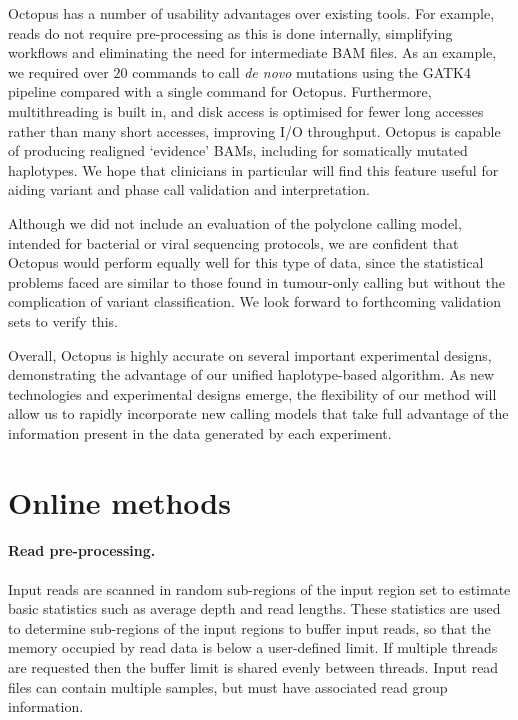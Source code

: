 \documentclass[notitlepage, twocolumn, 10pt]{article}
\begin{document}
Octopus has a number of usability advantages over existing tools.  For example, reads do not require pre-processing as this is done internally, simplifying workflows and eliminating the need for intermediate BAM files. As an example, we required over $20$ commands to call \textit{de novo} mutations using the GATK4 pipeline compared with a single command for Octopus. Furthermore, multithreading is built in, and disk access is optimised for fewer long accesses rather than many short accesses, improving I/O throughput. Octopus is capable of producing realigned `evidence' BAMs, including for somatically mutated haplotypes. We hope that clinicians in particular will find this feature useful for aiding variant and phase call validation and interpretation.

Although we did not include an evaluation of the polyclone calling model, intended for bacterial or viral sequencing protocols, we are confident that Octopus would perform equally well for this type of data, since the statistical problems faced are similar to those found in tumour-only calling but without the complication of variant classification. We look forward to forthcoming validation sets \cite{RN165} to verify this.

Overall, Octopus is highly accurate on several important experimental designs, demonstrating the advantage of our unified haplotype-based algorithm. As new technologies and experimental designs emerge, the flexibility of our method will allow us to rapidly incorporate new calling models that take full advantage of the information present in the data generated by each experiment.




\section*{Online methods}\small

\paragraph*{Read pre-processing.} Input reads are scanned in random sub-regions of the input region set to estimate basic statistics such as average depth and read lengths. These statistics are used to determine sub-regions of the input regions to buffer input reads, so that the memory occupied by read data is below a user-defined limit. If multiple threads are requested then the buffer limit is shared evenly between threads. Input read files can contain multiple samples, but must have associated read group information.
\end{document}

